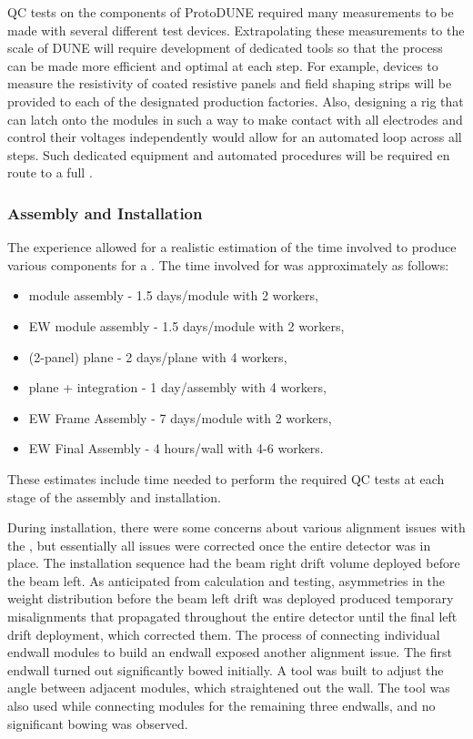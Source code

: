 QC tests on the  components of ProtoDUNE required many measurements to be made with several different test devices.  Extrapolating these measurements to the scale of DUNE will require development of dedicated tools so that the  process can be made more efficient and optimal at each step.
For example, devices to measure the resistivity of  coated resistive panels and field shaping strips will be provided to each of the designated production factories.  Also, designing a rig that can latch onto the  modules in such a way to make contact with all electrodes and control their voltages independently would allow for an automated loop across all steps.
Such dedicated equipment and automated procedures will be required en route to a full .

\subsubsection{Assembly and Installation}
\label{sec:fdsp-hv-protodune-lessons-assy}

The  experience allowed for a realistic estimation of the time involved to produce various  components for a .
The time involved for  was approximately as follows:
\begin{itemize}
\item {} module assembly - 1.5 days/module with 2 workers,
\item EW module assembly - 1.5 days/module with 2 workers,
\item {} (2-panel) plane - 2 days/plane with 4 workers,
\item {} plane +  integration - 1 day/assembly with 4 workers,
\item EW Frame Assembly - 7 days/module with 2 workers,
\item EW Final Assembly - 4 hours/wall with 4-6 workers.
\end{itemize}
These estimates include time needed to perform the required QC tests at each stage of the assembly and installation.

During installation, there were some concerns about various alignment issues with the , but essentially all issues were corrected once the entire detector was in place.
The  installation sequence had the beam right drift volume deployed before the beam left.
As anticipated from calculation and testing, asymmetries in the weight distribution before the beam left drift was deployed produced temporary misalignments that propagated throughout the entire detector until the final left drift deployment, which corrected them.
The process of connecting individual endwall modules to build an endwall exposed another alignment issue.
The first endwall turned out significantly bowed initially.
A tool was built to adjust the angle between adjacent modules, which straightened out the wall.
The tool was also used while connecting modules for the remaining three endwalls, and no significant bowing was observed.


